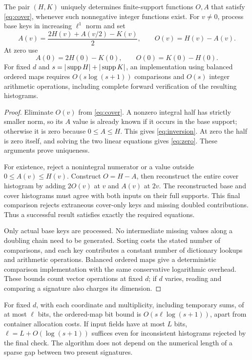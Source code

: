 \begin{theorem}
\label{thm:inversion}
The pair $(H,K)$ uniquely determines finite-support functions $O,A$ that
satisfy \eqref{eq:cover}, whenever such nonnegative integer functions exist.
For $v\ne0$, process base keys in increasing $\ell^1$ norm and set
\begin{equation}
 A(v)=\frac{2H(v)+A(v/2)-K(v)}{2},\qquad O(v)=H(v)-A(v).
 \label{eq:inversion}
\end{equation}
At zero use
\begin{equation}
 A(0)=2H(0)-K(0),\qquad O(0)=K(0)-H(0).
 \label{eq:zero}
\end{equation}
For fixed $d$ and $s=|\operatorname{supp} H|+|\operatorname{supp} K|$, an implementation using
balanced ordered maps requires
$O(s\log(s+1))$ comparisons and $O(s)$ integer arithmetic operations,
including complete forward verification of the resulting histograms.
\end{theorem}
\begin{proof}
Eliminate $O(v)$ from \eqref{eq:cover}. A nonzero integral half has strictly
smaller norm, so its $A$ value is already known if it occurs in the base
support; otherwise it is zero because $0\le A\le H$. This gives
\eqref{eq:inversion}. At zero the half is zero itself, and solving the two
linear equations gives \eqref{eq:zero}. These arguments prove uniqueness.

For existence, reject a nonintegral numerator or a value outside
$0\le A(v)\le H(v)$. Construct $O=H-A$, then reconstruct the entire cover
histogram by adding $2O(v)$ at $v$ and $A(v)$ at $2v$. The reconstructed
base and cover histograms must agree with both inputs on their full
supports. This final comparison rejects extraneous cover-only keys and
missing doubled contributions. Thus a successful result satisfies exactly
the required equations.

Only actual base keys are processed. No intermediate missing values along
a doubling chain need to be generated. Sorting costs the stated number of
comparisons, and each key contributes a constant number of dictionary
lookups and arithmetic operations. Balanced ordered maps give a
deterministic comparison implementation with the same conservative
logarithmic overhead. These bounds count vector operations at fixed $d$;
if $d$ varies, reading and comparing a signature also charges its dimension.
\end{proof}

For fixed $d$, with each coordinate and multiplicity, including temporary
sums, of at most $\ell$ bits, the ordered-map bit bound is
$O(s\ell\log(s+1))$, apart from container allocation costs. If input
fields have at most $L$ bits, $\ell=L+O(\log(s+1))$ suffices even for
inconsistent histograms rejected by the final check.
The algorithm does not depend on the numerical length of a sparse gap
between two present signatures.


